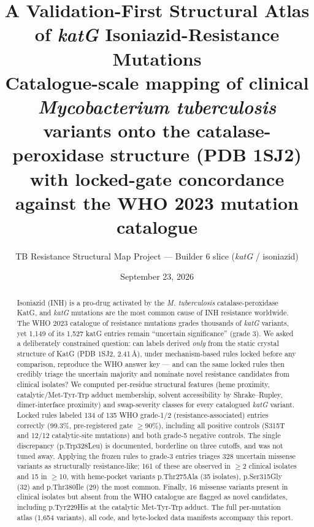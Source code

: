 \documentclass[11pt]{article}
\title{\textbf{A Validation-First Structural Atlas of \textit{katG} Isoniazid-Resistance Mutations}\\[6pt]
\large Catalogue-scale mapping of clinical \textit{Mycobacterium tuberculosis} variants onto the catalase-peroxidase structure (PDB 1SJ2) with locked-gate concordance against the WHO 2023 mutation catalogue}
\author{TB Resistance Structural Map Project --- Builder 6 slice (\textit{katG} / isoniazid)}
\date{September 23, 2026}
\begin{document}
\maketitle
\thispagestyle{empty}
\vfill
\begin{center}
\end{center}
\vfill
\newpage

\begin{abstract}
\noindent Isoniazid (INH) is a pro-drug activated by the \textit{M. tuberculosis} catalase-peroxidase KatG, and \textit{katG} mutations are the most common cause of INH resistance worldwide. The WHO 2023 catalogue of resistance mutations grades thousands of \textit{katG} variants, yet 1,149 of its 1,527 katG entries remain ``uncertain significance'' (grade 3). We asked a deliberately constrained question: can labels derived \emph{only} from the static crystal structure of KatG (PDB 1SJ2, 2.41\,\AA), under mechanism-based rules locked before any comparison, reproduce the WHO answer key --- and can the same locked rules then credibly triage the uncertain majority and nominate novel resistance candidates from clinical isolates? We computed per-residue structural features (heme proximity, catalytic/Met-Tyr-Trp adduct membership, solvent accessibility by Shrake--Rupley, dimer-interface proximity) and swap-severity classes for every catalogued \textit{katG} variant. Locked rules labeled 134 of 135 WHO grade-1/2 (resistance-associated) entries correctly (99.3\%, pre-registered gate $\geq$90\%), including all positive controls (S315T and 12/12 catalytic-site mutations) and both grade-5 negative controls. The single discrepancy (p.Trp328Leu) is documented, borderline on three cutoffs, and was not tuned away. Applying the frozen rules to grade-3 entries triages 328 uncertain missense variants as structurally resistance-like; 161 of these are observed in $\geq$2 clinical isolates and 15 in $\geq$10, with heme-pocket variants p.Thr275Ala (35 isolates), p.Ser315Gly (32) and p.Thr380Ile (29) the most common. Finally, 16 missense variants present in clinical isolates but absent from the WHO catalogue are flagged as novel candidates, including p.Tyr229His at the catalytic Met-Tyr-Trp adduct. The full per-mutation atlas (1,654 variants), all code, and byte-locked data manifests accompany this report.
\end{abstract}
\newpage
\tableofcontents
\newpage
\end{document}
